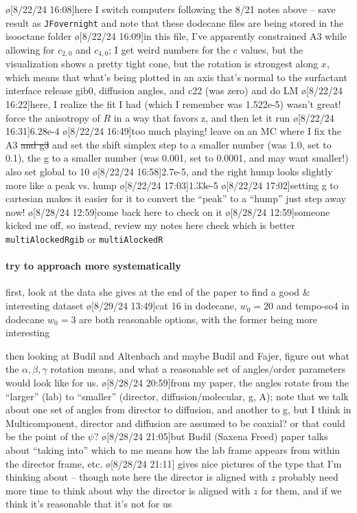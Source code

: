 \o[8/22/24 16:08]{here I switch computers following the 8/21 notes above -- save result as \texttt{JFovernight} and note that these dodecane files are being stored in the isooctane folder}
\o[8/22/24 16:09]{in this file, I've apparently constrained A3 while allowing for $c_{2,0}$ and $c_{4,0}$; I get weird numbers for the c values, but the visualization shows a pretty tight cone, but the rotation is strongest along $x$, which means that what's being plotted in an axis that's normal to the surfactant interface}
release gib0, diffusion angles, and c22 (was zero) and do LM
\o[8/22/24 16:22]{here, I realize the fit I had (which I remember was 1.522e-5) wasn't great!}
force the anisotropy of $R$ in a way that favors z, and then let it run
\o[8/22/24 16:31]{6.28e-4}
\o[8/22/24 16:49]{too much playing!}
leave on an MC where I fix the A3 \sout{and g3} and set the shift simplex step to a smaller number (was 1.0, set to 0.1),
the g to a smaller number (was 0.001, set to 0.0001, and may want smaller!)
also set global to 10
\o[8/22/24 16:58]{2.7e-5, and the right hump looks slightly more like a peak vs. hump}
\o[8/22/24 17:03]{1.33e-5}
\o[8/22/24 17:02]{setting g to cartesian makes it easier for it to convert the ``peak'' to a ``hump''}
just step away now!
\o[8/28/24 12:59]{come back here to check on it}
\o[8/28/24 12:59]{someone kicked me off, so instead, review my notes here}
check which is better \texttt{multiAlockedRgib} or \texttt{multiAlockedR}

\paragraph{try to approach more systematically}\label{sec:JFaltenbachSystematic}
first, look at the data she gives at the end of the paper to find a good \& interesting dataset
\o[8/29/24 13:49]{cat 16 in dodecane, $w_0=20$ and tempo-so4 in dodecane $w_0=3$ are both reasonable options, with the former being more interesting}

then looking at Budil and Altenbach and maybe Budil and Fajer, figure out what
the $\alpha,\beta,\gamma$ rotation means, and what a reasonable set of
angles/order parameters would look like for us.
\o[8/28/24 20:59]{from my paper, the angles rotate from the ``larger'' (lab) to ``smaller'' (director, diffusion/molecular, g, A); note that we talk about one set of angles from director to diffusion, and another to g, but I think in Multicomponent, director and diffusion are assumed to be coaxial? or that could be the point of the $\psi$?}
\o[8/28/24 21:05]{but Budil (Saxena Freed) paper talks about ``taking into'' which to me means how the lab frame appears from within the director frame, etc.}
\o[8/28/24 21:11]{\cite{Budil2006} gives nice pictures of the type that I'm thinking about -- though note here the director is aligned with $z$}
probably need more time to think about why the director is aligned with $z$ for them, and if we think it's reasonable that it's not for us

